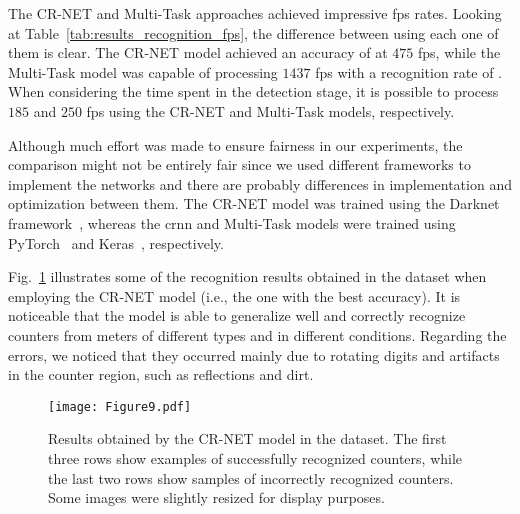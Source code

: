 The CR-NET and Multi-Task approaches achieved impressive \gls*{fps} rates. Looking at Table~\ref{tab:results_recognition_fps}, the difference between using each one of them is clear. The CR-NET model achieved an accuracy of  at $475$ \gls*{fps}, while the Multi-Task model was capable of processing $1437$ \gls*{fps} with a recognition rate of . When considering the time spent in the detection stage, it is possible to process $185$ and $250$ \gls*{fps} using the CR-NET and Multi-Task models, respectively. 

Although much effort was made to ensure fairness in our experiments, the comparison might not be entirely fair since we used different frameworks to implement the networks and there are probably differences in implementation and optimization between them. The CR-NET model was trained using the Darknet framework~\cite{darknet13}, whereas the \gls*{crnn} and Multi-Task models were trained using PyTorch~\cite{paszke2017automatic} and Keras~\cite{chollet2015keras}, respectively.

Fig.~\ref{fig:results_dataset} illustrates some of the recognition results obtained in the \dataset dataset when employing the CR-NET model (i.e., the one with the best accuracy). It is noticeable that the model is able to generalize well and correctly recognize counters from meters of different types and in different conditions. Regarding the errors, we noticed that they occurred mainly due to rotating digits and artifacts in the counter region, such as reflections and dirt.

\begin{figure}[!htb]
	\centering
	\texttt{[image: Figure9.pdf]}
	\vspace{1mm}
	\caption{Results obtained by the CR-NET model in the \dataset dataset. The first three rows show examples of successfully recognized counters, while the last two rows show samples of incorrectly recognized counters. Some images were slightly resized for display purposes.}
	\label{fig:results_dataset}  
	\vspace{-4mm} 
\end{figure}

